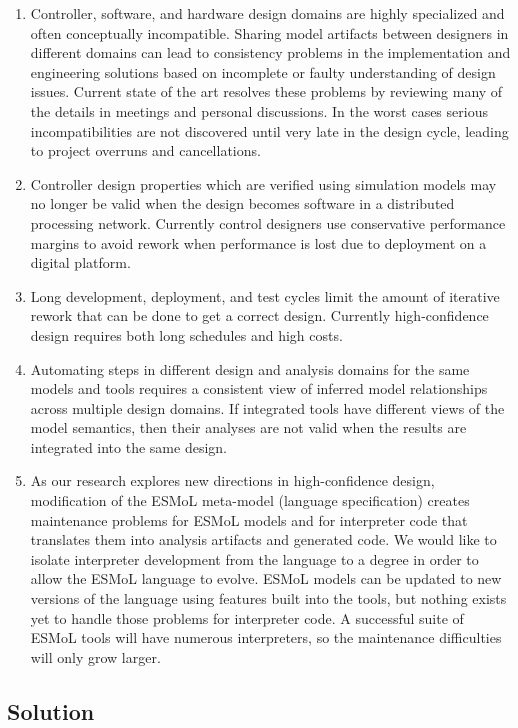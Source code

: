 \begin{enumerate}
 \item Controller, software, and hardware design domains are highly specialized and often conceptually
incompatible.  Sharing model artifacts between designers in different domains can lead to consistency
problems in the implementation and engineering solutions based on incomplete or faulty understanding of
design issues.  Current state of the art resolves these problems by reviewing many of the details in 
meetings and personal discussions.  In the worst cases serious incompatibilities are not discovered until
very late in the design cycle, leading to project overruns and cancellations.
 \item Controller design properties which are verified using simulation models may no longer be valid
when the design becomes software in a distributed processing network.  Currently control designers use conservative
performance margins to avoid rework when performance is lost due to deployment on a digital platform.
 \item Long development, deployment, and test cycles limit the amount of iterative rework that can be done
to get a correct design.  Currently high-confidence design requires both long schedules and high costs.
 \item Automating steps in different design and analysis domains for the same models and tools requires
a consistent view of inferred model relationships across multiple design domains.  If integrated tools
have different views of the model semantics, then their analyses are not valid when the results are 
integrated into the same design.
 \item As our research explores new directions in high-confidence design, modification of the ESMoL 
meta-model (language specification) creates maintenance problems for ESMoL models and for interpreter code 
that translates them into analysis artifacts and generated code.  We would like to isolate interpreter
development from the language to a degree in order to allow the ESMoL language to evolve.  ESMoL models
can be updated to new versions of the language using features built into the tools, but nothing exists 
yet to handle those problems for interpreter code.  A successful suite of ESMoL tools will have numerous
interpreters, so the maintenance difficulties will only grow larger.
\end{enumerate}

\subsection{Solution}

